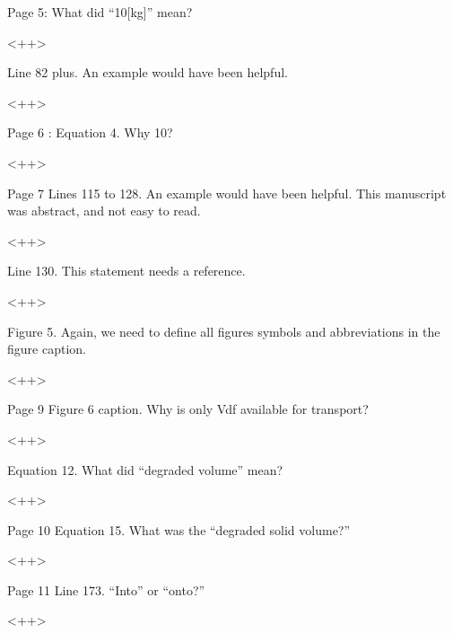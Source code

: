 \documentclass[answers,12pt]{exam}
\begin{document}
\begin{questions}
\question Page 5: What did “10[kg]” mean?
\begin{solution}
<++>
\end{solution}

 

\question Line 82 plus. An example would have been helpful.
\begin{solution}
<++>
\end{solution}

 

\question Page 6 : Equation 4. Why 10?

 
\begin{solution}
<++>
\end{solution}

\question Page 7 Lines 115 to 128. An example would have been helpful. This manuscript was abstract, and not easy to read.

\begin{solution}
<++>
\end{solution}
 

\question Line 130. This statement needs a reference.

\begin{solution}
<++>
\end{solution}

\question Figure 5. Again, we need to define all figures symbols and abbreviations in the figure caption.
\begin{solution}
<++>
\end{solution}

 

\question Page 9 Figure 6 caption. Why is only Vdf available for transport?
\begin{solution}
<++>
\end{solution}
 

\question Equation 12. What did “degraded volume” mean?
\begin{solution}
<++>
\end{solution}

 

\question Page 10 Equation 15. What was the “degraded solid volume?”

\begin{solution}
<++>
\end{solution}
 

\question Page 11 Line 173. “Into” or “onto?”
\begin{solution}
<++>
\end{solution}

 


\end{questions}
\end{document}
